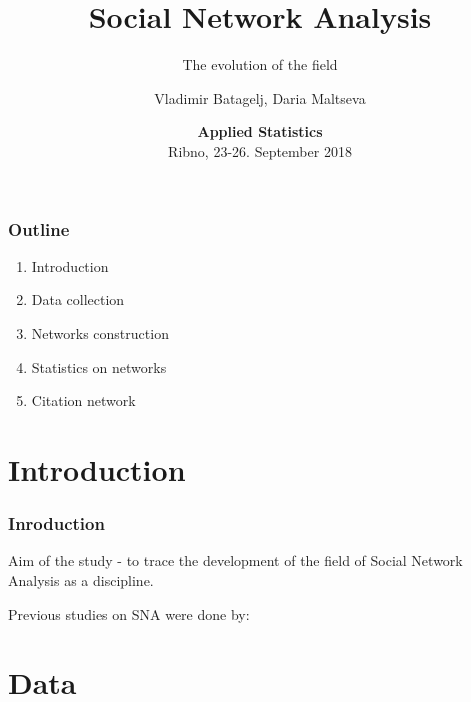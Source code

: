 \documentclass[hyperref={pdfstartview={FitBH -32768},
                         pdfpagemode=FullScreen,
                         plainpages=false,
                         colorlinks=true}
              ]{beamer}
\title[SNA. Evolution of the field]{\textbf{Social Network Analysis}}\subtitle{The evolution of the field}
\author[V. Batagelj, D. Maltseva]{Vladimir Batagelj, Daria Maltseva}
\institute[IMFM \& IAM UP]{IMFM Ljubljana, IAM UP Koper and NRU HSE Moscow }
\date[September 23-26, 2018]{\small
\textcolor{BrickRed}{\textbf{Applied Statistics}} \\
Ribno, 23-26. September 2018}
\newcommand{\clock}{\count254=\time \divide\count254 by 60
 \count255=\count254 \multiply\count255 by -60
 \advance\count255 by \time
 \ifnum\count254<10 0\fi\number\count254\,:\,%
 \ifnum\count255<10 0\fi\number\count255}
\begin{document}

\frame{\maketitle}

\begin{frame}
\frametitle{Outline}
\small
\begin{enumerate}
\item Introduction 
\item Data collection 
\item Networks construction 
\item Statistics on networks
\item Citation network
\end{enumerate}




\end{frame}

\section{Introduction}

\begin{frame}[fragile]
\frametitle{Inroduction}
\small

Aim of the study - to trace the development of the field of Social Network Analysis as a discipline. \medskip

Previous studies on SNA were done by:

\end{frame}

\section{Data}
\end{document}
